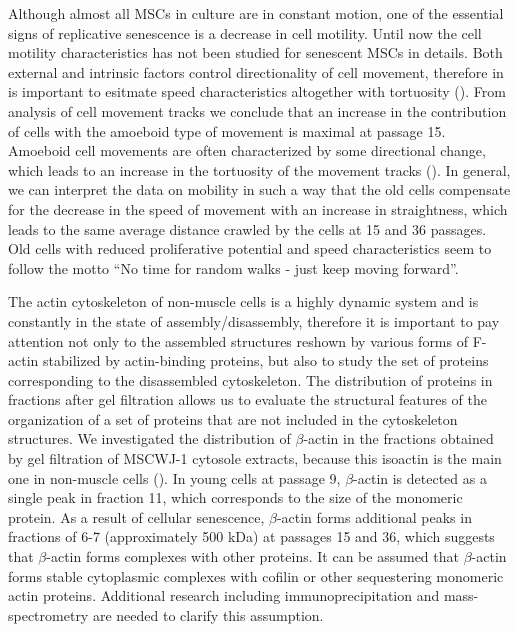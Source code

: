 \documentclass[alpha-refs]{wiley-article}
\begin{document}
Although almost all MSCs in culture are in constant motion, one of the essential signs of replicative senescence is a decrease in cell motility.
Until now the cell motility characteristics has not been studied for senescent MSCs in details.
Both external and intrinsic factors control directionality of cell movement, therefore in is important to esitmate speed characteristics altogether with tortuosity (\cite{tiurin2013molecular}).
From analysis of cell movement tracks we conclude that an increase in the contribution of cells with the amoeboid type of movement is maximal at passage 15.
Amoeboid cell movements are often characterized by some directional change, which leads to an increase in the tortuosity of the movement tracks (\cite{li2008persistent}).
In general, we can interpret the data on mobility in such a way that the old cells compensate for the decrease in the speed of movement with an increase in straightness, which leads to the same average distance crawled by the cells at 15 and 36 passages.
Old cells with reduced proliferative potential and speed characteristics seem to follow the motto “No time for random walks - just keep moving forward”.

The actin cytoskeleton of non-muscle cells is a highly dynamic system and is constantly in the state of assembly/disassembly, therefore it is important to pay attention not only to the assembled structures reshown by various forms of F-actin stabilized by actin-binding proteins, but also to study the set of proteins corresponding to the disassembled cytoskeleton.
The distribution of proteins in fractions after gel filtration allows us to evaluate the structural features of the organization of a set of proteins that are not included in the cytoskeleton structures.
We investigated the distribution of $\beta$-actin in the fractions obtained by gel filtration of MSCWJ-1 cytosole extracts, because this isoactin is the main one in non-muscle cells (\cite{khaitlina2001functional}).
In young cells at passage 9, $\beta$-actin is detected as a single peak in fraction 11, which corresponds to the size of the monomeric protein.
As a result of cellular senescence, $\beta$-actin forms additional peaks in fractions of 6-7 (approximately 500 kDa) at passages 15 and 36, which suggests that $\beta$-actin forms complexes with other proteins.
It can be assumed that $\beta$-actin forms stable cytoplasmic complexes with cofilin or other sequestering monomeric actin proteins.
Additional research including immunoprecipitation and mass-spectrometry are needed to clarify this assumption.
\end{document}
